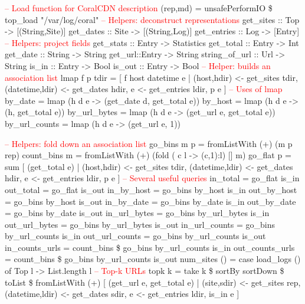 \begin{code}

\textcolor{red}{-- Load function for CoralCDN description}
(rep,md) = unsafePerformIO \$ top\_load "/var/log/coral"
\mbox{}
\textcolor{red}{-- Helpers: deconstruct representations }
get\_sites :: Top -> [(String,Site)]
get\_dates :: Site -> [(String,Log)]
get\_entries :: Log -> [Entry]
\mbox{}
\textcolor{red}{-- Helpers: project fields }
get\_stats :: Entry -> Statistics
get\_total :: Entry -> Int
get\_date :: String -> String 
get\_url::Entry -> String
string\_of\_url :: Url -> String
is\_in :: Entry -> Bool
is\_out :: Entry -> Bool
\mbox{}
\textcolor{red}{-- Helper: builds an association list }
lmap f p tdir = 
   [ f host datetime e | (host,hdir) <- get\_sites tdir,
                         (datetime,ldir) <- get\_dates hdir,
                          e <- get\_entries ldir,
                          p e ]
\mbox{}
\textcolor{red}{-- Uses of lmap}
by\_date = lmap ({}h d e -> (get\_date d, get\_total e))
by\_host = lmap ({}h d e -> (h, get\_total e))
by\_url\_bytes = lmap ({}h d e -> (get\_url e, get\_total e))
by\_url\_counts = lmap ({}h d e -> (get\_url e, 1))

\mbox{}
\textcolor{red}{-- Helpers: fold down an association list}
go\_bins m p = fromListWith (+) (m p rep)
\mbox{}
count\_bins m = fromListWith (+) (fold ({} c l -> (c,1):l) [] m)
\mbox{}
go\_flat p = 
  sum [ (get\_total e) | (host,hdir) <- get\_sites tdir,
                        (datetime,ldir) <- get\_dates hdir,
                        e <- get\_entries ldir,
                        p e ]
\mbox{}
\textcolor{red}{-- Several useful queries }
in\_total = go\_flat is\_in
out\_total = go\_flat is\_out
in\_by\_host = go\_bins by\_host is\_in
out\_by\_host = go\_bins by\_host is\_out 
in\_by\_date = go\_bins by\_date is\_in 
out\_by\_date = go\_bins by\_date is\_out
in\_url\_bytes = go\_bins by\_url\_bytes is\_in
out\_url\_bytes = go\_bins by\_url\_bytes is\_out
in\_url\_counts = go\_bins by\_url\_counts is\_in
out\_url\_counts = go\_bins by\_url\_counts is\_out
in\_counts\_urls = count\_bins \$ go\_bins by\_url\_counts is\_in
out\_counts\_urls = count\_bins \$ go\_bins by\_url\_counts is\_out
num\_sites () = case load\_logs () of Top l -> List.length l
\mbox{}
\textcolor{red}{-- Top-k URLs } 
topk k = 
  take k \$ sortBy sortDown \$ toList \$
  fromListWith (+)
    [ (get\_url e, get\_total e)
    | (site,sdir) <- get\_sites rep,
      (datetime,ldir) <- get\_dates sdir,
      e <- get\_entries ldir,
      is\_in e ]
\end{code}
\vfill{}